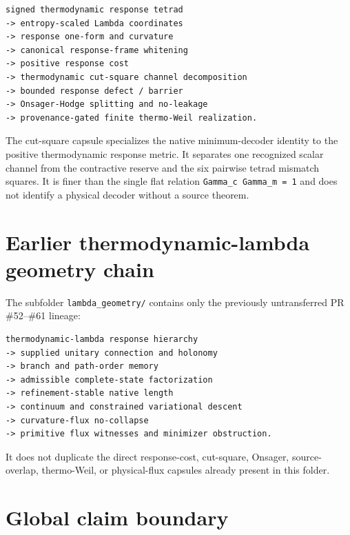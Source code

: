 \begin{verbatim}
signed thermodynamic response tetrad
-> entropy-scaled Lambda coordinates
-> response one-form and curvature
-> canonical response-frame whitening
-> positive response cost
-> thermodynamic cut-square channel decomposition
-> bounded response defect / barrier
-> Onsager-Hodge splitting and no-leakage
-> provenance-gated finite thermo-Weil realization.
\end{verbatim}

The cut-square capsule specializes the native minimum-decoder identity to the positive thermodynamic response metric. It separates one recognized scalar channel from the contractive reserve and the six pairwise tetrad mismatch squares. It is finer than the single flat relation \texttt{Gamma\_c\ Gamma\_m\ =\ 1} and does not identify a physical decoder without a source theorem.

\hypertarget{earlier-thermodynamic-lambda-geometry-chain}{%
\section{Earlier thermodynamic-lambda geometry chain}\label{earlier-thermodynamic-lambda-geometry-chain}}

The subfolder \texttt{lambda\_geometry/} contains only the previously untransferred PR \#52--\#61 lineage:

\begin{verbatim}
thermodynamic-lambda response hierarchy
-> supplied unitary connection and holonomy
-> branch and path-order memory
-> admissible complete-state factorization
-> refinement-stable native length
-> continuum and constrained variational descent
-> curvature-flux no-collapse
-> primitive flux witnesses and minimizer obstruction.
\end{verbatim}

It does not duplicate the direct response-cost, cut-square, Onsager, source-overlap, thermo-Weil, or physical-flux capsules already present in this folder.

\hypertarget{global-claim-boundary}{%
\section{Global claim boundary}\label{global-claim-boundary}}

